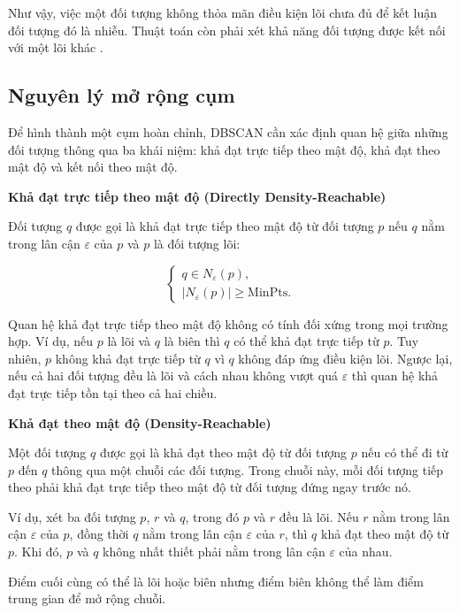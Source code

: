 Như vậy, việc một đối tượng không thỏa mãn điều kiện lõi chưa đủ để kết luận đối tượng đó là nhiễu. Thuật toán còn phải xét khả năng đối tượng được kết nối với một lõi khác \parencite{ester1996dbscan}.

\subsection{Nguyên lý mở rộng cụm}

Để hình thành một cụm hoàn chỉnh, DBSCAN cần xác định quan hệ giữa những đối tượng thông qua ba khái niệm: khả đạt trực tiếp theo mật độ, khả đạt theo mật độ và kết nối theo mật độ.

\textbf{Khả đạt trực tiếp theo mật độ (Directly Density-Reachable)}

Đối tượng \(q\) được gọi là khả đạt trực tiếp theo mật độ từ đối tượng \(p\) nếu \(q\) nằm trong lân cận \(\varepsilon\) của \(p\) và \(p\) là đối tượng lõi:

\begin{equation}
\begin{cases}
    q \in N_{\varepsilon}(p),\\
    |N_{\varepsilon}(p)| \geq \mathrm{MinPts}.
\end{cases}
\end{equation}

Quan hệ khả đạt trực tiếp theo mật độ không có tính đối xứng trong mọi trường hợp. Ví dụ, nếu \(p\) là lõi và \(q\) là biên thì \(q\) có thể khả đạt trực tiếp từ \(p\). Tuy nhiên, \(p\) không khả đạt trực tiếp từ \(q\) vì \(q\) không đáp ứng điều kiện lõi. Ngược lại, nếu cả hai đối tượng đều là lõi và cách nhau không vượt quá \(\varepsilon\) thì quan hệ khả đạt trực tiếp tồn tại theo cả hai chiều.

\textbf{Khả đạt theo mật độ (Density-Reachable)}

Một đối tượng \(q\) được gọi là khả đạt theo mật độ từ đối tượng \(p\) nếu có thể đi từ \(p\) đến \(q\) thông qua một chuỗi các đối tượng. Trong chuỗi này, mỗi đối tượng tiếp theo phải khả đạt trực tiếp theo mật độ từ đối tượng đứng ngay trước nó.

Ví dụ, xét ba đối tượng \(p\), \(r\) và \(q\), trong đó \(p\) và \(r\) đều là lõi. Nếu \(r\) nằm trong lân cận \(\varepsilon\) của \(p\), đồng thời \(q\) nằm trong lân cận \(\varepsilon\) của \(r\), thì \(q\) khả đạt theo mật độ từ \(p\). Khi đó, \(p\) và \(q\) không nhất thiết phải nằm trong lân cận \(\varepsilon\) của nhau.

Điểm cuối cùng có thể là lõi hoặc biên nhưng điểm biên không thể làm điểm trung gian để mở rộng chuỗi.

